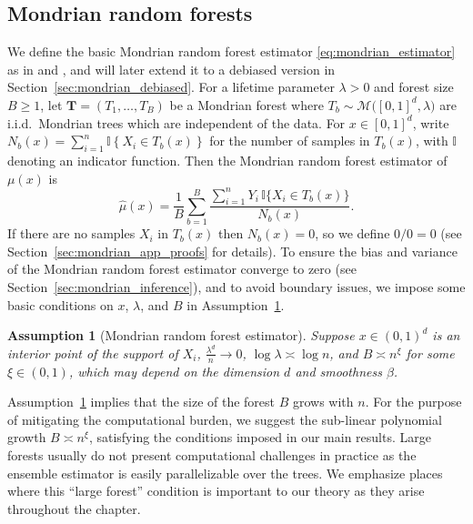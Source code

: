 \documentclass[11pt,lof]{puthesis}
\newcommand{\I}{\ensuremath{\mathbb{I}}}
\newcommand{\bT}{\ensuremath{\mathbf{T}}}
\newcommand{\cM}{\ensuremath{\mathcal{M}}}
\theoremstyle{break}
\newtheorem{assumption}{Assumption}[section]
\theoremstyle{proof}
\begin{document}
\subsection{Mondrian random forests}
\label{sec:mondrian_forests}

We define the basic Mondrian random forest estimator
\eqref{eq:mondrian_estimator} as in \citet{lakshminarayanan2014mondrian} and
\citet{mourtada2020minimax}, and will later extend it to a debiased version in
Section~\ref{sec:mondrian_debiased}. For a lifetime parameter $\lambda > 0$ and
forest size $B \geq 1$, let $\bT = (T_1, \ldots, T_B)$ be a Mondrian forest
where $T_b \sim \cM\big([0,1]^d, \lambda\big)$ are i.i.d.\ Mondrian trees which
are independent of the data. For $x \in [0,1]^d$, write $N_b(x) = \sum_{i=1}^{n}
\I \left\{ X_i \in T_b(x) \right\}$ for the number of samples in $T_b(x)$, with
$\I$ denoting an indicator function. Then the Mondrian random forest estimator
of $\mu(x)$ is
%
\begin{equation}
  \label{eq:mondrian_estimator}
  \hat\mu(x) = \frac{1}{B} \sum_{b=1}^B
  \frac{\sum_{i=1}^n Y_i \, \I\big\{ X_i \in T_b(x) \big\}} {N_b(x)}.
\end{equation}
%
If there are no samples $X_i$ in $T_b(x)$ then $N_b(x) = 0$, so we define
$0/0 = 0$ (see Section~\ref{sec:mondrian_app_proofs} for details). To ensure the
bias and variance of the Mondrian random forest estimator converge to zero (see
Section~\ref{sec:mondrian_inference}), and to avoid boundary issues, we impose
some basic conditions on $x$, $\lambda$, and $B$ in
Assumption~\ref{ass:mondrian_estimator}.

\begin{assumption}[Mondrian random forest estimator]%
  \label{ass:mondrian_estimator}
  Suppose $x \in (0,1)^d$ is an interior point of the support of $X_i$,
  $\frac{\lambda^d}{n} \to 0$,
  $\log \lambda \asymp \log n$,
  and $B \asymp n^{\xi}$ for some $\xi \in (0, 1)$,
  which may depend on the dimension $d$ and smoothness $\beta$.
\end{assumption}

Assumption~\ref{ass:mondrian_estimator} implies that the size of the forest $B$
grows with $n$. For the purpose of mitigating the computational burden, we
suggest the sub-linear polynomial growth $B \asymp n^{\xi}$, satisfying the
conditions imposed in our main results. Large forests usually do not present
computational challenges in practice as the ensemble estimator is easily
parallelizable over the trees. We emphasize places where this ``large forest''
condition is important to our theory as they arise throughout the chapter.
\end{document}
